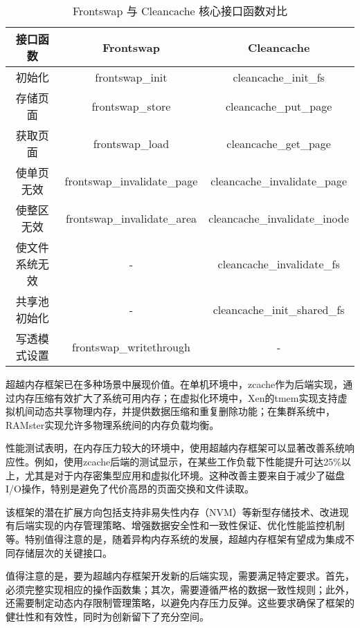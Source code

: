 \begin{table}[htbp]
    \caption{Frontswap 与 Cleancache 核心接口函数对比}
    \begin{tabularx}{\textwidth}{ccc} %
    \toprule
    \textbf{接口函数} & \textbf{Frontswap} & \textbf{Cleancache} \\
    \midrule
    初始化 & frontswap\_init & cleancache\_init\_fs \\
    
    存储页面 & frontswap\_store & cleancache\_put\_page \\
    
    获取页面 & frontswap\_load & cleancache\_get\_page \\
    
    使单页无效 & frontswap\_invalidate\_page & cleancache\_invalidate\_page \\
    
    使整区无效 & frontswap\_invalidate\_area & cleancache\_invalidate\_inode \\
    
    使文件系统无效 & - & cleancache\_invalidate\_fs \\
    
    共享池初始化 & - & cleancache\_init\_shared\_fs \\
    
    写透模式设置 & frontswap\_writethrough & - \\
    \bottomrule
    \end{tabularx}
    \end{table}


超越内存框架已在多种场景中展现价值。在单机环境中，zcache作为后端实现，通过内存压缩有效扩大了系统可用内存；在虚拟化环境中，Xen的tmem实现支持虚拟机间动态共享物理内存，并提供数据压缩和重复删除功能；在集群系统中，RAMster实现允许多物理系统间的内存负载均衡。

性能测试表明，在内存压力较大的环境中，使用超越内存框架可以显著改善系统响应性。例如，使用zcache后端的测试显示，在某些工作负载下性能提升可达25\%以上，尤其是对于内存密集型应用和虚拟化环境。这种改善主要来自于减少了磁盘I/O操作，特别是避免了代价高昂的页面交换和文件读取。

该框架的潜在扩展方向包括支持非易失性内存（NVM）等新型存储技术、改进现有后端实现的内存管理策略、增强数据安全性和一致性保证、优化性能监控机制等。特别值得注意的是，随着异构内存系统的发展，超越内存框架有望成为集成不同存储层次的关键接口。

值得注意的是，要为超越内存框架开发新的后端实现，需要满足特定要求。首先，必须完整实现相应的操作函数集；其次，需要遵循严格的数据一致性规则；此外，还需要制定动态内存限制管理策略，以避免内存压力反弹。这些要求确保了框架的健壮性和有效性，同时为创新留下了充分空间。

